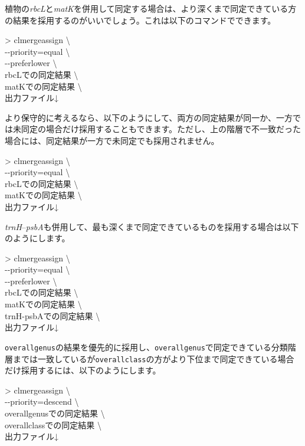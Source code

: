 \documentclass[titlepage,10pt,a4paper]{jsbook}
\newenvironment{cmd}{\begin{oframed}\raggedright\ttfamily\footnotesize\setlength{\baselineskip}{1.4em}}{\end{oframed}\vspace{-1em}}
\begin{document}
植物の\textit{rbcL}と\textit{matK}を併用して同定する場合は、より深くまで同定できている方の結果を採用するのがいいでしょう。これは以下のコマンドでできます。
\begin{cmd}
{\textgreater} clmergeassign {\textbackslash}\\
{-}{-}priority=equal {\textbackslash}\\
{-}{-}preferlower {\textbackslash}\\
rbcLでの同定結果 {\textbackslash}\\
matKでの同定結果 {\textbackslash}\\
出力ファイル↓
\end{cmd}
より保守的に考えるなら、以下のようにして、両方の同定結果が同一か、一方では未同定の場合だけ採用することもできます。ただし、上の階層で不一致だった場合には、同定結果が一方で未同定でも採用されません。
\begin{cmd}
{\textgreater} clmergeassign {\textbackslash}\\
{-}{-}priority=equal {\textbackslash}\\
rbcLでの同定結果 {\textbackslash}\\
matKでの同定結果 {\textbackslash}\\
出力ファイル↓
\end{cmd}
\textit{trnH}--\textit{psbA}も併用して、最も深くまで同定できているものを採用する場合は以下のようにします。
\begin{cmd}
{\textgreater} clmergeassign {\textbackslash}\\
{-}{-}priority=equal {\textbackslash}\\
{-}{-}preferlower {\textbackslash}\\
rbcLでの同定結果 {\textbackslash}\\
matKでの同定結果 {\textbackslash}\\
trnH-psbAでの同定結果 {\textbackslash}\\
出力ファイル↓
\end{cmd}
\texttt{overall{\textunderscore}genus}の結果を優先的に採用し、\texttt{overall{\textunderscore}genus}で同定できている分類階層までは一致しているが\texttt{overall{\textunderscore}class}の方がより下位まで同定できている場合だけ採用するには、以下のようにします。
\begin{cmd}
{\textgreater} clmergeassign {\textbackslash}\\
{-}{-}priority=descend {\textbackslash}\\
overall{\textunderscore}genusでの同定結果 {\textbackslash}\\
overall{\textunderscore}classでの同定結果 {\textbackslash}\\
出力ファイル↓
\end{cmd}
\end{document}
